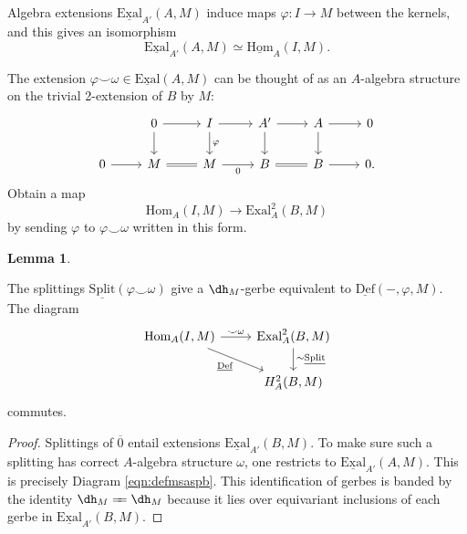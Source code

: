 \documentclass[11pt,reqno]{amsart}
\theoremstyle{definition}
\newtheorem{lemma}[theorem]{Lemma}
\newcommand{\Hom}{\textrm{Hom}}
\newcommand{\HHom}{\underline{\textrm{Hom}}}
\newcommand{\dd}[1]{\dh_{#1}}
\newcommand{\EExal}{\underline{\textrm{Exal}}}
\newcommand{\DDef}{\underline{\textrm{Def}}}
\newcommand{\Exal}{\textrm{Exal}}
\newcommand{\longequals}{\xlongequal{\: \:}}
\newcommand{\Split}{\underline{\textrm{Split}}}
\renewcommand{\bar}[1]{\overline{#1}}
\begin{document}
Algebra extensions $\EExal_{A'}(A, M)$ induce maps $\varphi : I \to M$ between the kernels, and this gives an isomorphism \cite[pg 353]{wisealgs2}
\[\EExal_{A'}(A, M) \simeq \HHom_A(I, M).\]

The extension $\varphi \smile \omega \in \EExal(A, M)$ can be thought of as an $A$-algebra structure on the trivial 2-extension of $B$ by $M$:
\[\begin{tikzcd}
 &0 \ar[r] \ar[d] &I \ar[d, "\varphi"] \ar[r] &A' \ar[r] \ar[d] &A \ar[d] \ar[r] &0 \\
0 \ar[r] &M \ar[r, equals] &M \ar[r, "0", swap] &B \ar[r, equals] &B \ar[r] &0.
\end{tikzcd}\]
Obtain a map 
\[\Hom_A(I, M) \to \Exal^2_A(B, M)\]
by sending $\varphi$ to $\varphi \smile \omega$ written in this form. 




\begin{lemma}\label{lem:split=defm}

The splittings $\Split(\varphi \smile \omega)$ give a $\dd{M}$-gerbe equivalent to $\DDef(-, \varphi, M)$. The diagram
\[\begin{tikzcd}
\Hom_A(I, M) \ar[r, "\smile \omega"] \ar[dr, "\DDef", swap] \ar[dr, bend left=15, phantom]        &\Exal_A^2(B, M) \ar[d, "\sim \Split"]        \\
        &H^2_A(B, M)
\end{tikzcd}\]
commutes. 

\end{lemma}

\begin{proof}

Splittings of $\bar 0$ entail extensions $\EExal_{A'}(B, M)$. To make sure such a splitting has correct $A$-algebra structure $\omega$, one restricts to $\EExal_{A'}(A, M)$. This is precisely Diagram \eqref{eqn:defmsaspb}. This identification of gerbes is banded by the identity $\dd{M} \longequals \dd{M}$ because it lies over equivariant inclusions of each gerbe in $\EExal_{A'}(B, M)$. 

\end{proof}
\end{document}
